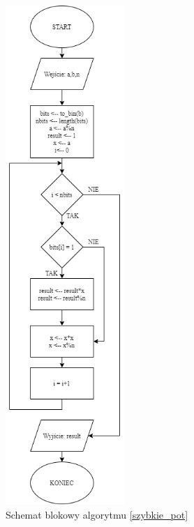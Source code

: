 \documentclass[]{article}
\begin{document}
	\begin{figure}[H]
		\begin{center}
			\includegraphics[width=4.5cm]{alg 3.png} \caption{Schemat blokowy algorytmu \ref{szybkie_pot}}
		\end{center}
	\end{figure}
	
\end{document}
